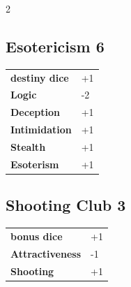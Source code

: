 \begin{multicols}{2}
\begin{tcolorbox}

\end{tcolorbox}

\begin{tcolorbox}
    \subsection*{Esotericism \hfill \small{6 }}
    \tcblower




\begin{tabular}{@{}ll@{}}
    \textbf{destiny dice} & +1\\
    \textbf{Logic} & -2\\
    \textbf{Deception} & +1\\
    \textbf{Intimidation} & +1\\
    \textbf{Stealth} & +1\\
    \textbf{Esoterism} & +1\\
\end{tabular}


\end{tcolorbox}

\begin{tcolorbox}
    \subsection*{Shooting Club \hfill \small{3 }}
    \tcblower




\begin{tabular}{@{}ll@{}}
    \textbf{bonus dice} & +1\\
    \textbf{Attractiveness} & -1\\
    \textbf{Shooting} & +1\\
\end{tabular}



\end{tcolorbox}
\end{multicols}
